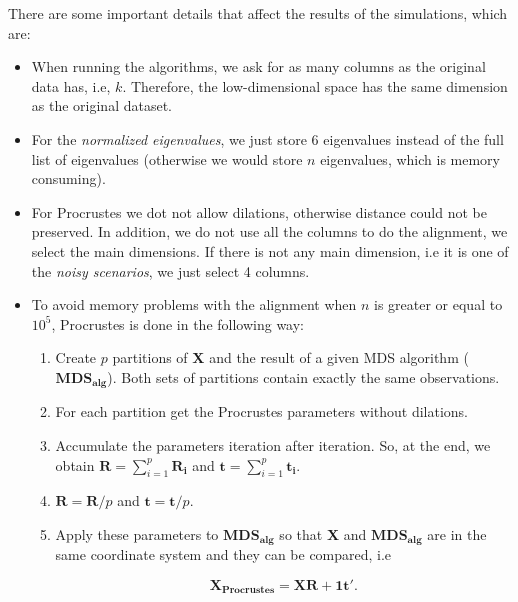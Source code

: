 \documentclass[11pt]{report}
\begin{document}
\indent There are some important details that affect the results of the 
simulations, which are:

\begin{itemize}

\item When running the algorithms, we ask for as many columns as the original 
data has, i.e, $k$. Therefore, the low-dimensional space has the same 
dimension as the original dataset.

\item For the \textit{normalized eigenvalues}, we just store 6 eigenvalues 
instead of the full list of eigenvalues (otherwise we would store $n$ 
eigenvalues, which is memory consuming). 

\item For Procrustes we dot not allow dilations, otherwise distance could not
be preserved. In addition, we do not use all the columns 
to do the alignment, we select the main dimensions. If there is not any
main dimension, i.e it is one of the \textit{noisy scenarios}, we just select 4 
columns. 

\item To avoid memory problems with the alignment when $n$ is greater or 
equal to $10^5$, Procrustes is done in the following way:

\begin{enumerate}

\item Create $p$ partitions of \textbf{X} and the result of a given MDS 
algorithm ($\mathbf{MDS_{alg}}$). Both sets of partitions contain exactly the
same observations.


\item For each partition get the Procrustes parameters without dilations.

\item Accumulate the parameters iteration after iteration. So, at the end, 
we obtain $\mathbf{R} = \sum_{i = 1}^p \mathbf{R_i}$ and 
$\mathbf{t} = \sum_{i = 1}^p \mathbf{t_i}$.

\item $\mathbf{R} = \mathbf{R}/p$ and $\mathbf{t} = \mathbf{t}/p$.

\item Apply these parameters to $\mathbf{MDS_{alg}}$ so that 
\textbf{X} and $\mathbf{MDS_{alg}}$ are in the same coordinate system and
they can be compared, i.e

\[
\mathbf{X_{Procrustes}} = \mathbf{X} \mathbf{R} + \mathbf{1t'}.
\]


\end{enumerate}
\end{itemize}
\end{document}
